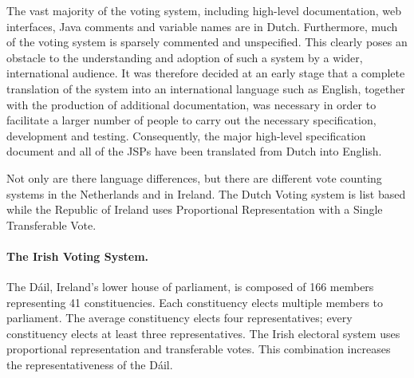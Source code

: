 \documentclass[times, 10pt, twocolumn]{article}
\newcommand{\NL}{the Netherlands\xspace}
\begin{document}
\label{subsubsec:docum-writ-transl}

The vast majority of the voting system, including high-level documentation, web 
interfaces, Java comments and variable names are in Dutch. Furthermore, much of 
the voting system is sparsely commented and unspecified. This clearly poses an 
obstacle to the understanding and adoption of such a system by a wider, 
international audience. It was therefore decided at an early stage that a 
complete translation of the 
system into an international language such as English, together with the
production of additional documentation, was necessary 
in order to facilitate a larger number of people to carry out the necessary 
specification, development and testing. Consequently, the major high-level 
specification document and all of the JSPs have been translated from Dutch into 
English.

\label{subsubsec:other-voting-systems}

Not only are there language differences, but there are different vote counting 
systems in \NL and in Ireland. The Dutch Voting system is list based while the
Republic of
Ireland uses Proportional Representation with a Single Transferable Vote.

\paragraph{The Irish Voting System.} %

The D{\'a}il, Ireland's lower house of parliament, is composed of 166 members 
representing 41 constituencies. Each constituency elects multiple members to 
parliament. The average constituency elects four representatives; every 
constituency elects at least three representatives. The Irish electoral system 
uses proportional representation and transferable votes. This combination 
increases the representativeness of the D{\'a}il.
\end{document}
